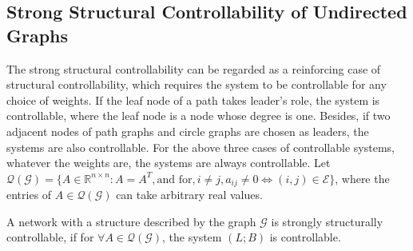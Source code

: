 \documentclass[a4paper,11pt]{article}
\begin{document}
{\subsection{Strong Structural Controllability of Undirected Graphs}
The strong structural controllability can be regarded as a reinforcing case of structural controllability, which requires the system to be controllable for any choice of weights.
If the leaf node of a path takes leader's role, the system is controllable,  where the leaf node is a node whose degree is one. Besides, if two adjacent nodes of path graphs and circle graphs are chosen as leaders, the systems are also controllable. For the above three cases of controllable systems, whatever the weights are, the systems are always controllable. Let $\mathcal{Q}(\mathcal{G})=\{A\in\mathbb{R}^{n\times n}: A=A^T, \text{and for},i\ne j,a_{ij}\ne0\Leftrightarrow(i,j)\in\mathcal{E}\}$, where the entries of $A\in\mathcal{Q}(\mathcal{G})$ can take arbitrary real values.

\begin{definition}
A network with a structure described by the graph $\mathcal{G}$ is strongly structurally controllable, if for $\forall A\in\mathcal{Q}(\mathcal{G})$, the system $(L;B)$ is controllable.
\end{definition}

}
\end{document}
